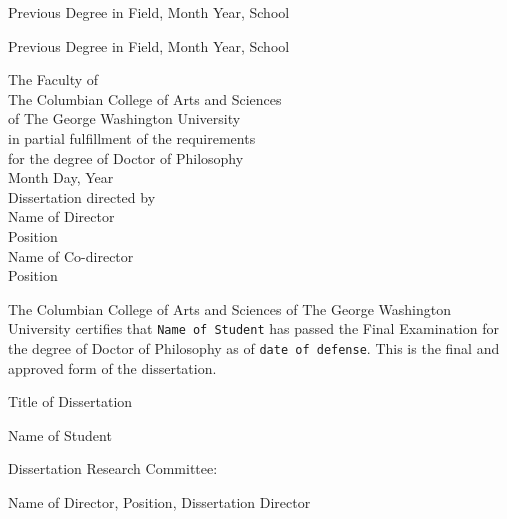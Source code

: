 \documentclass[12pt]{article}
\begin{document}
\thispagestyle{empty}
\vspace*{1in}
\begin{center}
\centerline{Previous Degree in Field, Month Year, School}
\centerline{Previous Degree in Field, Month Year, School}\vspace*{24pt}
\begin{center}
The Faculty of\\The Columbian College of Arts and Sciences \\ of The George
Washington University\\ in partial fulfillment of the requirements\\ for the degree
of Doctor of Philosophy\\[36pt]
Month Day, Year\\[36pt] %
Dissertation directed by\\[\baselineskip]
Name of Director\\
Position\\[\baselineskip]
Name of Co-director\\
Position
\end{center}
\end{center}
\pagestyle{plain}
\setcounter{page}{1}
\newpage
\begin{doublespace}
\noindent
The Columbian College of Arts and Sciences of The George Washington University certifies that \texttt{Name of Student} has passed the Final Examination for the degree of Doctor of Philosophy as of \texttt{date of defense}. This is the final and approved form of the dissertation.
\end{doublespace}
\vspace{12pt}
\begin{center}
Title of Dissertation

\vspace*{36pt}
Name of Student
\vspace{24pt}
\end{center}
Dissertation Research Committee:
\vspace{12pt}

\indent Name of Director, Position, Dissertation Director
\vspace{12pt}
\end{document}

